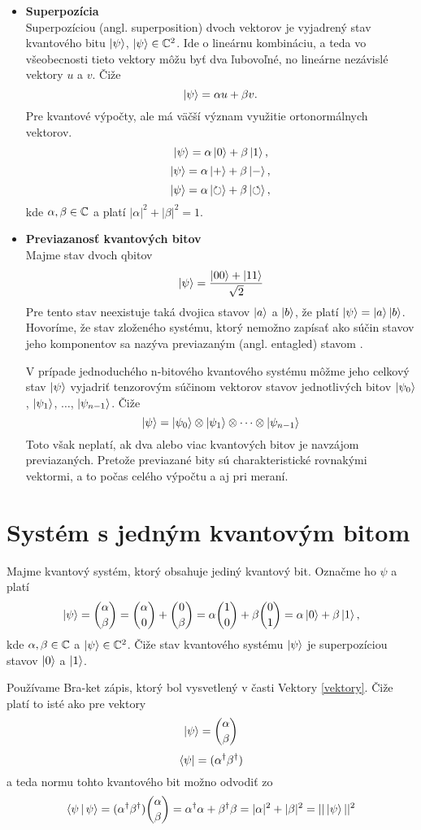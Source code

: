 \begin{itemize}
\item[] \textbf{Superpozícia} \\
Superpozíciou (angl. superposition) dvoch vektorov je vyjadrený stav kvantového bitu \(\Ket{\psi}\), \(\Ket{\psi} \in \mathbb{C}^2\).
Ide o lineárnu kombináciu, a teda vo všeobecnosti tieto vektory môžu byť dva ľubovoľné, no lineárne nezávislé vektory \(u\) a \(v\). Čiže
\[\Ket{\psi} = \alpha u + \beta v.\]
Pre kvantové výpočty, ale má väčší význam využitie ortonormálnych vektorov.
\[\Ket{\psi} = \alpha \Ket{0} + \beta \Ket{1},\]
\[\Ket{\psi} = \alpha \Ket{+} + \beta \Ket{-},\]
\[\Ket{\psi} = \alpha \Ket{\circlearrowright} + \beta \Ket{\circlearrowleft},\]
kde \(\alpha, \beta \in \mathbb{C}\) a platí \(|\alpha|^2 + |\beta|^2 = 1\).

\item[] \textbf{Previazanosť kvantových bitov} \\
Majme stav dvoch qbitov
\[\Ket{\psi} = \frac{\Ket{00} + \Ket{11}}{\sqrt{2}}\]
Pre tento stav neexistuje taká dvojica stavov \(\Ket{a}\) a \(\Ket{b}\), že platí \(\Ket{\psi} = \Ket{a}\Ket{b}\).
Hovoríme, že stav zloženého systému, ktorý nemožno zapísať ako súčin stavov jeho komponentov sa nazýva previazaným (angl. entagled) stavom \cite{Nie+00}.

V prípade jednoduchého n-bitového kvantového systému môžme jeho celkový stav \(\Ket{\psi}\) vyjadriť tenzorovým súčinom vektorov stavov jednotlivých bitov \(\Ket{\psi_0}\), \(\Ket{\psi_1}\), \(\dots\), \(\Ket{\psi_{n-1}}\).
Čiže
\[\Ket{\psi} = \Ket{\psi_0} \otimes \Ket{\psi_1} \otimes \dots \otimes \Ket{\psi_{n-1}}\]
Toto však neplatí, ak dva alebo viac kvantových bitov je navzájom previazaných.
Pretože previazané bity sú charakteristické rovnakými vektormi, a to počas celého výpočtu a aj pri meraní.
\end{itemize}

\section{Systém s jedným kvantovým bitom}
Majme kvantový systém, ktorý obsahuje jediný kvantový bit. Označme ho \(\psi\)
a platí
\[\Ket{\psi} = \binom{\alpha}{\beta} = \binom{\alpha}{0} + \binom{0}{\beta} = \alpha \binom{1}{0} + \beta \binom{0}{1} = \alpha \Ket{0} + \beta \Ket{1}, \]
kde \(\alpha, \beta \in \mathbb{C}\) a \(\Ket{\psi} \in \mathbb{C}^{2}\).
Čiže stav kvantového systému \(\Ket{\psi}\) je superpozíciou stavov \(\Ket{0}\) a \(\Ket{1}\).

Používame Bra-ket zápis, ktorý bol vysvetlený v časti Vektory \ref{vektory}. 
Čiže platí to isté ako pre vektory
\[\Ket{\psi} = \binom{\alpha}{\beta}\]
\[\Bra{\psi} = (\alpha^{\dag}\beta^{\dag})\]
a teda normu tohto kvantového bit možno odvodiť zo
\[\Braket{\psi|\psi} = (\alpha^{\dag}\beta^{\dag})\binom{\alpha}{\beta} = \alpha^{\dag}\alpha + \beta^{\dag}\beta = |\alpha|^{2} + |\beta|^{2} = ||\Ket{\psi}||^{2}\]

